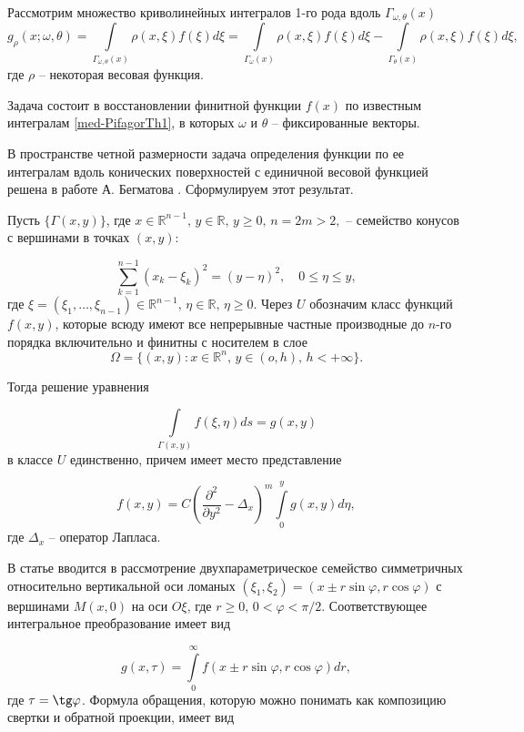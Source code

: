 Рассмотрим множество криволинейных интегралов 1-го рода вдоль $\Gamma_{\omega, \theta}(x)$
\begin{equation}
	\label{med-PifagorTh1}
	g_\rho(x;\omega,\theta)=\int\limits_{\Gamma_{\omega, \theta}(x)} \rho(x,\xi)f(\xi)d\xi=\int\limits_{\Gamma_{\omega}(x)} \rho(x,\xi)f(\xi)d\xi-\int\limits_{\Gamma_{\theta}(x)} \rho(x,\xi)f(\xi)d\xi,
\end{equation}
где $\rho$ -- некоторая весовая функция.


Задача состоит в восстановлении финитной функции $f(x)$ по известным интегралам \eqref{med-PifagorTh1}, в которых $\omega$ и $\theta$ -- фиксированные векторы.

В пространстве четной размерности задача определения функции по ее интегралам вдоль конических поверхностей с единичной весовой функцией решена в работе А. Бегматова \cite{med-metka3}. Сформулируем этот результат.

Пусть $\{\Gamma(x,y)\}$, где $x\in \mathbb R^{n-1}, \, y\in\mathbb R, \, y\geq0,\, n=2m>2,$ -- семейство конусов с вершинами в точках $(x,y)$:

$$\sum\limits_{k=1}^{n-1}(x_k-\xi_k)^2=(y-\eta)^2, \quad 0\leq\eta\leq y,$$
где $\xi=(\xi_1,\ldots,\xi_{n-1})\in\mathbb R^{n-1},\, \eta\in\mathbb R, \, \eta\geq0$. Через $U$ обозначим класс функций $f(x,y)$, которые всюду имеют все непрерывные частные производные до $n$-го порядка включительно и финитны с носителем в слое
$$\Omega=\{(x,y): x\in \mathbb R^n,\, y\in (o,h), \, h<+\infty\}.$$

Тогда решение уравнения

$$\int\limits_{\Gamma(x,y)}f(\xi,\eta)ds=g(x,y)$$
в классе $U$ единственно, причем имеет место представление

\begin{equation}
	\label{med-PifagorTh0}
	f(x,y)=C\left(\frac{\partial^2}{\partial y^2}-\Delta_x\right)^m\int\limits_0^y g(x,y)d\eta,\end{equation}
где $\Delta_x$ -- оператор Лапласа.


В статье \cite{med-metka4}  вводится в рассмотрение  двухпараметрическое семейство симметричных относительно вертикальной оси ломаных $(\xi_1,\xi_2)=(x\pm r \sin\varphi, r \cos\varphi)$ с вершинами $M(x,0)$ на оси $O\xi$, где $r\geq0,\, 0<\varphi<\pi/2$. Соответствующее интегральное преобразование имеет вид

$$g(x,\tau)=\int\limits_0^\infty f(x\pm r\sin\varphi, r\cos\varphi)dr,$$
где $\tau=\tg\varphi$. Формула обращения, которую можно понимать как композицию свертки и обратной проекции, имеет вид

